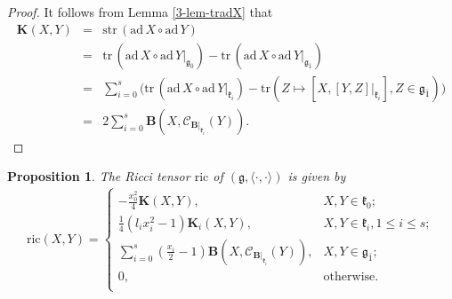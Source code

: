 \documentclass[reqno]{amsart}
\newtheorem{prop}[thm]{Proposition}
\theoremstyle{definition}
\begin{document}
\begin{proof}
It follows from Lemma \ref{3-lem-tradX} that
\begin{eqnarray*}
  \mathbf{K}(X,Y) &=& \mathrm{str}\,(\mathrm{ad}\,X\circ\mathrm{ad}\,Y) \\
   &=&  \mathrm{tr}\,(\mathrm{ad}\,X\circ\mathrm{ad}\,Y|_{\mathfrak{g}_{\bar{0}}})
   -\mathrm{tr}\,(\mathrm{ad}\,X\circ\mathrm{ad}\,Y|_{\mathfrak{g}_{\bar{1}}}) \\
   &=& \sum_{i=0}^{s}\Big(\mathrm{tr}\,(\mathrm{ad}\,X\circ\mathrm{ad}\,Y|_{\mathfrak{k}_{i}})
   -\mathrm{tr}\left(Z\mapsto [X,[Y,Z]|_{\mathfrak{k}_{i}}],Z\in\mathfrak{g}_{\bar{1}}\right)\Big) \\
   &=& 2\sum_{i=0}^{s}\mathbf{B}\left(X,\mathcal{C}_{\mathbf{B}|_{\mathfrak{k}_{i}}}(Y)\right).
\end{eqnarray*}
\end{proof}
\begin{prop}\label{3-prop-ric-tensor}
The Ricci tensor $\mathrm{ric}$ of $(\mathfrak{g},\langle\cdot,\cdot\rangle)$ is given by
\begin{eqnarray*}
\mathrm{ric}(X,Y)=
\begin{cases}
-\frac{x_{0}^{2}}{4}\mathbf{K}(X,Y),       &X,Y\in\mathfrak{k}_{0};\\
\frac{1}{4}(l_{i}x_{i}^{2}-1)\mathbf{K}_{i}(X,Y),                                               &X,Y\in\mathfrak{k}_{i}, 1\leq i\leq s;\\
\sum\limits_{i=0}^{s}\left(\frac{x_{i}}{2}-1\right)\mathbf{B}(X,\mathcal{C}_{\mathbf{B}|_{\mathfrak{k}_{i}}}(Y)),    &X,Y\in\mathfrak{g}_{\bar{1}};\\
0,                                                                                              &\mathrm{otherwise}.\\
\end{cases}
\end{eqnarray*}
\end{prop}
\end{document}
